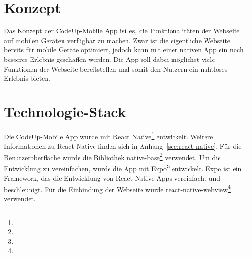 \documentclass[main.tex]{subfiles}
\begin{document}
    \section{Konzept}
    Das Konzept der CodeUp-Mobile App ist es, die Funktionalitäten der Webseite auf mobilen Geräten verfügbar zu machen.
    Zwar ist die eigentliche Webseite bereits für mobile Geräte optimiert, jedoch kann mit einer nativen App ein noch besseres Erlebnis geschaffen werden.
    Die App soll dabei möglichst viele Funktionen der Webseite bereitstellen und somit den Nutzern ein nahtloses Erlebnis bieten.
    \section{Technologie-Stack}
    Die CodeUp-Mobile App wurde mit React Native\footnote{} entwickelt.
    Weitere Informationen zu React Native finden sich in Anhang~\ref{sec:react-native}.
    Für die Benutzeroberfläche wurde die Bibliothek native-base\footnote{} verwendet.
    Um die Entwicklung zu vereinfachen, wurde die App mit Expo\footnote{} entwickelt.
    Expo ist ein Framework, das die Entwicklung von React Native-Apps vereinfacht und beschleunigt.
    Für die Einbindung der Webseite wurde react-native-webview\footnote{} verwendet.
\end{document}
